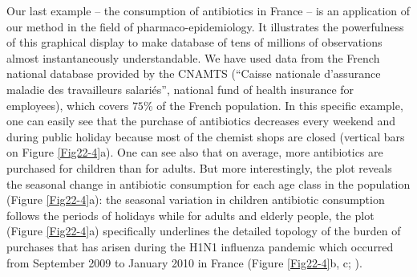 Our last example -- the consumption of antibiotics in France -- is an
application of our method in the field of pharmaco-epidemiology. It illustrates the
powerfulness of this graphical display to make database of tens of millions of
observations almost instantaneously understandable. We have used data from the
French national database provided by the CNAMTS (“Caisse nationale d’assurance
maladie des travailleurs salariés”, national fund of health insurance for
employees), which covers $75\%$ of the French population. In this specific
example, one can easily see that the purchase of antibiotics decreases every
weekend and during public holiday because most of the chemist shops are closed
(vertical bars on Figure \ref{Fig22-4}a). One can see also that on average, more antibiotics
are purchased for children than for adults. But more interestingly, the plot
reveals the seasonal change in antibiotic consumption for each age class in the
population (Figure \ref{Fig22-4}a):  the seasonal variation in children antibiotic consumption
follows the periods of holidays while for adults and elderly people, the plot
(Figure \ref{Fig22-4}a) specifically underlines the detailed topology of the burden of
purchases that has arisen during the H1N1 influenza pandemic which occurred from
September 2009 to January 2010 in France (Figure \ref{Fig22-4}b, c;
\citealp{lemaitre2010a,lemaitre2012a}).

